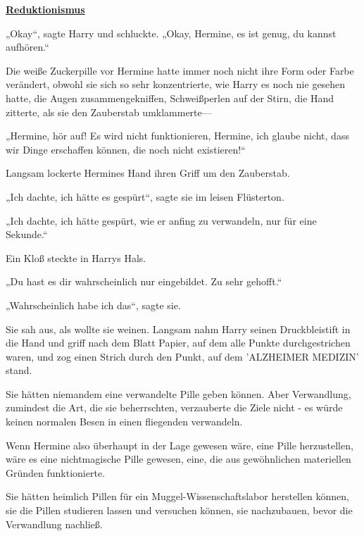 

\hypertarget{reduktionismus}{%

\textbf{\uline{Reduktionismus}}

„Okay“, sagte Harry und schluckte. „Okay, Hermine, es ist genug, du kannst aufhören.“

Die weiße Zuckerpille vor Hermine hatte immer noch nicht ihre Form oder Farbe verändert, obwohl sie sich so sehr konzentrierte, wie Harry es noch nie gesehen hatte, die Augen zusammengekniffen, Schweißperlen auf der Stirn, die Hand zitterte, als sie den Zauberstab umklammerte—

„Hermine, hör auf! Es wird nicht funktionieren, Hermine, ich glaube nicht, dass wir Dinge erschaffen können, die noch nicht existieren!“

Langsam lockerte Hermines Hand ihren Griff um den Zauberstab.

„Ich dachte, ich hätte es gespürt“, sagte sie im leisen Flüsterton.

„Ich dachte, ich hätte gespürt, wie er anfing zu verwandeln, nur für eine Sekunde.“

Ein Kloß steckte in Harrys Hals.

„Du hast es dir wahrscheinlich nur eingebildet. Zu sehr gehofft.“

„Wahrscheinlich habe ich das“, sagte sie.

Sie sah aus, als wollte sie weinen. Langsam nahm Harry seinen Druckbleistift in die Hand und griff nach dem Blatt Papier, auf dem alle Punkte durchgestrichen waren, und zog einen Strich durch den Punkt, auf dem 'ALZHEIMER MEDIZIN' stand.

Sie hätten niemandem eine verwandelte Pille geben können. Aber Verwandlung, zumindest die Art, die sie beherrschten, verzauberte die Ziele nicht - es würde keinen normalen Besen in einen fliegenden verwandeln.

Wenn Hermine also überhaupt in der Lage gewesen wäre, eine Pille herzustellen, wäre es eine nichtmagische Pille gewesen, eine, die aus gewöhnlichen materiellen Gründen funktionierte.

Sie hätten heimlich Pillen für ein Muggel-Wissenschaftslabor herstellen können, sie die Pillen studieren lassen und versuchen können, sie nachzubauen, bevor die Verwandlung nachließ.

}
